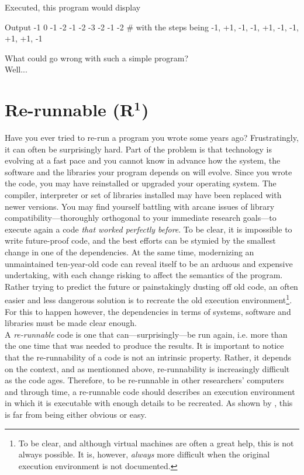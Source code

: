 \documentclass[a4paper,11pt]{article}
\begin{document}
Executed, this program would display
\begin{code}{Output}
-1  0 -1 -2 -1 -2 -3 -2 -1 -2 # with the steps being -1, +1, -1, -1, +1, -1, -1, +1, +1, -1
\end{code}

What could go wrong with such a simple program?\\
\vfill
Well...
\vfill


\clearpage
\section*{Re-runnable (R$^{\mathbf 1}$)}

Have you ever tried to re-run a program you wrote some years ago? Frustratingly, it can often be surprisingly hard. Part of the problem is that technology is evolving at a fast pace and you cannot  know in advance how the system, the software and the libraries your program depends on will evolve. Since you wrote the code, you may have reinstalled or upgraded  your operating system. The compiler, interpreter or set of libraries installed may have been replaced with newer versions. You may find yourself battling with arcane issues of library compatibility---thoroughly orthogonal to your immediate research  goals---to execute again a code \emph{that worked perfectly before}. To be clear, it is impossible to write future-proof code, and the best efforts can be stymied by the smallest change in one of the dependencies. At the same time, modernizing an unmaintained ten-year-old code can reveal itself to be an arduous and expensive undertaking, with each change risking to affect the semantics of the program. Rather trying to predict the future or painstakingly dusting off old code, an often easier and less dangerous solution is to recreate the old execution environment\footnote{To be clear, and although virtual machines are often a great help, this is not always possible. It is, however, \emph{always} more difficult when the original execution environment is not documented.}. For this to happen however, the dependencies in terms of systems, software and libraries must be made clear enough.\\

A \emph{re-runnable} code is one that can---surprisingly---be run again, i.e. more than the one time that was needed to produce the results. It is important to notice that the re-runnability of a code is not an intrinsic property. Rather, it depends on the context, and as mentionned above, re-runnability is increasingly difficult as the code ages. Therefore, to be re-runnable in other researchers' computers and through time, a re-runnable code should describes an execution environment in which it is executable with enough details to be recreated. As shown by \citep{Collberg:2016}, this is far from being either obvious or easy.\\
\end{document}
